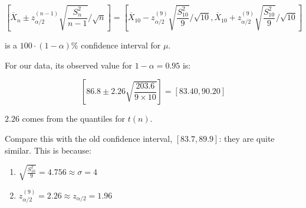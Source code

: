 \documentclass[a4paper]{article}
\begin{document}
                \[
                    \left[\overline X_n \pm z_{\alpha/2}^{(n-1)}
                    \sqrt{\frac{S_n^2}{n - 1}} / \sqrt{n}\right] =
                    \left[\overline X_{10} - z_{\alpha/2}^{(9)}
                    \sqrt{\frac{S_{10}^2}{9}} / \sqrt{10}, \overline X_{10} +
                    z_{\alpha/2}^{(9)} \sqrt{\frac{S_{10}^2}{9}} / \sqrt{10}
                    \right]
                \]

                is a $100 \cdot (1 - \alpha)$\% confidence interval for $\mu$.

                For our data, its observed value for $1 - \alpha = 0.95$ is:

                \[
                    \left[86.8 \pm 2.26 \sqrt{\frac{203.6}{9 \times 10}}\right]
                    = [83.40, 90.20]
                \]

                $2.26$ comes from the quantiles for $t(n)$.

                Compare this with the old confidence interval, $[83.7, 89.9]$:
                they are quite similar. This is because:

                \begin{enumerate}
                    \item $\sqrt{\frac{S_{10}^2}{9}} = 4.756 \approx \sigma = 4$
                    \item $z_{\alpha/2}^{(9)} = 2.26 \approx z_{\alpha/2} =
                        1.96$
                \end{enumerate}
\end{document}
